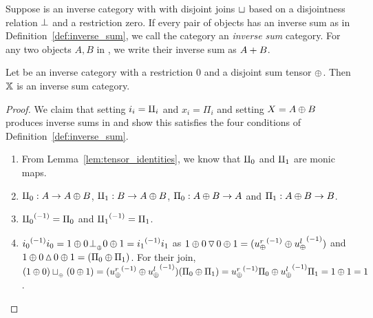 \begin{definition}\label{def:inverse_sum_category}
  Suppose \X is an inverse category with with disjoint joins $\sqcup$ based on a disjointness
  relation $\perp$ and a restriction zero. If every pair of objects has an inverse sum as in
  Definition~\ref{def:inverse_sum}, we call the category an \emph{inverse sum} category. For any
  two objects $A,B$ in \X, we write their inverse sum as ${{A}+{B}}$.
\end{definition}

\begin{lemma}\label{lem:tensor_disjoint_sum_cats_are_inverse_sum_categories}
  Let \X be an inverse category with a restriction 0 and a disjoint sum tensor $\oplus$. Then $\mathbb{X}$ is
  an inverse sum category.
\end{lemma}
\begin{proof}
  We claim that setting $i_i = \amalg_{i}$ and $x_i = \Pi_i$ and setting $X = A\oplus B$ produces inverse
  sums in \X and show this satisfies the four conditions of Definition~\ref{def:inverse_sum}.
  \begin{enumerate}[{(}i{)}]
    \item From Lemma~\ref{lem:tensor_identities}, we know that $\amalg_{0}$ and $\amalg_{1}$ are monic maps.
    \item $\amalg_{0} : A \to A\oplus B$, $\amalg_{1}: B \to A\oplus B$, $\Pi_0: A\oplus B \to A$ and $\Pi_1: A\oplus B \to B$.
    \item ${\amalg_{0}}^{(-1)} = \Pi_0$ and ${\amalg_{1}}^{(-1)} = \Pi_1$.
    \item ${i_0}^{(-1)}i_0 = 1\oplus 0 {}_{{}_{}}{\perp_{{}_{\oplus}}} 0\oplus1 = {i_1}^{(-1)}i_1$ as
      $1\oplus0 \operatorname{\triangledown} 0\oplus1 = ({u_{\oplus}^r}^{(-1)}\oplus{\ensuremath{u_{\oplus}^l}}^{(-1)})$ and
      $1\oplus0 \operatorname{\vartriangle} 0\oplus1 = (\Pi_0\oplus\Pi_1)$. For their join,
      $(1\oplus0)\sqcup_{{_{\oplus}}} (0\oplus1) = ({u_{\oplus}^r}^{(-1)}\oplus{\ensuremath{u_{\oplus}^l}}^{(-1)})(\Pi_0\oplus\Pi_1) =
      {u_{\oplus}^r}^{(-1)}\Pi_0 \oplus {\ensuremath{u_{\oplus}^l}}^{(-1)}\Pi_1 = 1\oplus1 = 1$.
  \end{enumerate}
\end{proof}


